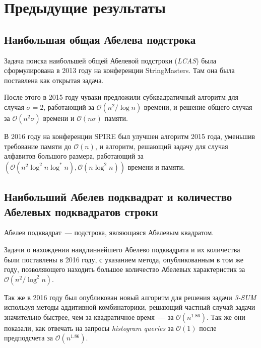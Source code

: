 \section{Предыдущие результаты}
\subsection{Наибольшая общая Абелева подстрока}
Задача поиска наибольшей общей Абелевой подстроки (\textit{LCAS}) была сформулирована в 2013 году на конференции StringMasters. Там она была поставлена как открытая задача.

После этого в 2015 году чуваки предложили субквадратичный алгоритм для случая $\sigma=2$, работающий за $\mathcal{O}(n^2/\log n)$ времени, и решение общего случая за $\mathcal{O}(n^2\sigma)$ времени и $\mathcal{O}(n\sigma)$ памяти.

В 2016 году на конференции SPIRE был улучшен алгоритм 2015 года, уменьшив требование памяти до $\mathcal{O}(n)$, и алгоритм, решающий задачу для случая алфавитов большого размера, работающий за $(\mathcal{O}(n^2 \log^2 n \log^* n), \mathcal{O}(n \log^2 n))$ времени и памяти.

\subsection{Наибольший Абелев подквадрат и количество Абелевых подквадратов строки}
Абелев подквадрат~--- подстрока, являющаяся Абелевым квадратом.

Задачи о нахождении наидлиннейшего Абелево подквадрата и их количества были поставлены в 2016 году, с указанием метода, опубликованным в том же году, позволяющего находить большое количество Абелевых характеристик за $\mathcal{O}(n^2 / \log^2 n)$.

Так же в 2016 году был опубликован новый алгоритм для решения задачи \textit{3-SUM} используя методы аддитивной комбинаторики, решающий частный случай задачи значительно быстрее, чем за квадратичное время~--- за $\mathcal{O}(n^{1.86})$. Так же они показали, как отвечать на запросы \textit{histogram queries} за $\mathcal{O}(1)$ после предподсчета за $\mathcal{O}(n^{1.86})$.